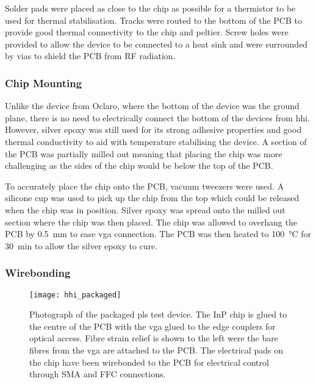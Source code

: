 Solder pads were placed as close to the chip as possible for a thermistor to be used for thermal stabilisation. Tracks were routed to the bottom of the PCB to provide good thermal connectivity to the chip and peltier. Screw holes were provided to allow the device to be connected to a heat sink and were surrounded by vias to shield the PCB from RF radiation.

\subsubsection*{Chip Mounting}

Unlike the device from Oclaro, where the bottom of the device was the ground plane, there is no need to electrically connect the bottom of the devices from \ac{hhi}. However, silver epoxy was still used for its strong adhesive properties and good thermal conductivity to aid with temperature stabilising the device. A section of the PCB was partially milled out meaning that placing the chip was more challenging as the sides of the chip would be below the top of the PCB.

To accurately place the chip onto the PCB, vacuum tweezers were used. A silicone cup was used to pick up the chip from the top which could be released when the chip was in position. Silver epoxy was spread onto the milled out section where the chip was then placed. The chip was allowed to overhang the PCB by \SI{0.5}{\mm} to ease \ac{vga} connection. The PCB was then heated to \SI{100}{\celsius} for \SI{30}{\minute} to allow the silver epoxy to cure.


\subsubsection*{Wirebonding}

\begin{figure}[t]
	\centering
	\texttt{[image: hhi\_packaged]}
	\caption[Photograph of packaged PLS test transmitter]{Photograph of the packaged \ac{pls} test device. The \acs{InP} chip is glued to the centre of the PCB with the \acs{vga} glued to the edge couplers for optical access. Fibre strain relief is shown to the left were the bare fibres from the \acs{vga} are attached to the PCB. The electrical pads on the chip have been wirebonded to the PCB for electrical control through SMA and FFC connections.}
	\label{fig:hhi_photo}
\end{figure}

